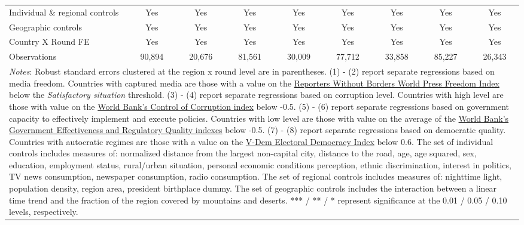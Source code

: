 \documentclass[11pt]{article}
\theoremstyle{plain}
\theoremstyle{plain}
\begin{document}
\begin{table}[H]
{\begin{tabular}{@{\extracolsep{5pt}} l c c c c c c c c}
   \midrule
   \smallskip
  Individual \& regional controls  & Yes & Yes & Yes & Yes & Yes & Yes & Yes & Yes\\
  Geographic controls  & Yes & Yes & Yes & Yes & Yes & Yes & Yes & Yes\\
  \smallskip
  Country X Round FE       & Yes& Yes & Yes& Yes & Yes & Yes & Yes & Yes\\
  \smallskip
  Observations&      90,894   &      20,676   &      81,561   &      30,009   &      77,712   &      33,858   &      85,227   &      26,343   \\
  \bottomrule
  \multicolumn{9}{p{22cm}}{\footnotesize \emph{Notes}: Robust standard errors clustered at the region x round level are in parentheses. (1) - (2) report separate regressions based on media freedom. Countries with captured media are those with a
  value on the \href{https://index.rsf.org}{Reporters Without Borders World Press Freedom Index} below the \textit{Satisfactory situation} threshold. (3) - (4) report separate regressions based on corruption level. Countries with high level are those with value on the \href{www.govindicators.org}{World Bank's Control of Corruption index} below -0.5. (5) - (6) report separate regressions based on government capacity to effectively implement and execute policies. Countries with low level are those with value on the average of the \href{www.govindicators.org}{World Bank's Government Effectiveness and Regulatory Quality indexes} below -0.5. (7) - (8) report separate regressions based on democratic quality. Countries with autocratic regimes are those with a value on the \href{https://www.v-dem.net/
  }{V-Dem Electoral Democracy Index} below 0.6. The set of individual controls includes measures of: normalized distance from the largest non-capital city, distance to the road, age, age squared, sex,
  education, employment status, rural/urban situation, personal economic conditions perception, ethnic discrimination, interest in politics, TV news consumption, newspaper consumption, radio consumption. The set of regional controls includes measures of: nighttime light, population density, region area, president birthplace dummy.
  The set of geographic controls includes the interaction between a linear time trend and the fraction of the region covered by mountains and deserts.
  *** / ** / * represent significance at the 0.01 / 0.05 / 0.10 levels, respectively.}
  \end{tabular}
  }
  \end{table}
  
\end{document}

